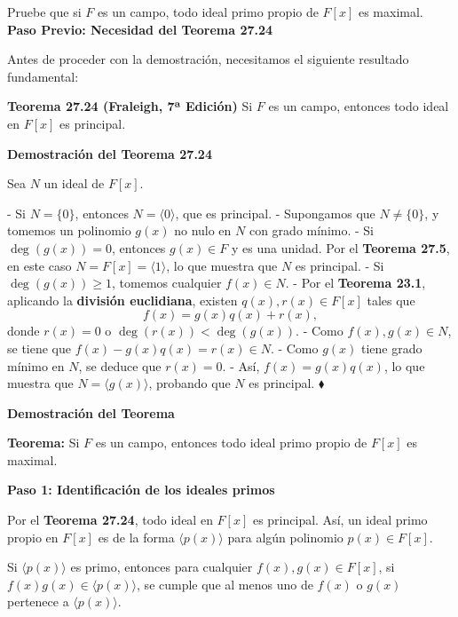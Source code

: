 Pruebe que si $F$ es un campo, todo ideal primo propio de $F[x]$ es maximal.
\\
\noindent
\textbf{Paso Previo: Necesidad del Teorema 27.24}

Antes de proceder con la demostración, necesitamos el siguiente resultado fundamental:

\smallskip

\textbf{Teorema 27.24 (Fraleigh, 7ª Edición)}  
Si \( F \) es un campo, entonces todo ideal en \( F[x] \) es principal.

\smallskip

\textbf{Demostración del Teorema 27.24}  

Sea \( N \) un ideal de \( F[x] \).  

- Si \( N = \{0\} \), entonces \( N = \langle 0 \rangle \), que es principal.  
- Supongamos que \( N \neq \{0\} \), y tomemos un polinomio \( g(x) \) no nulo en \( N \) con grado mínimo.  
  - Si \( \deg(g(x)) = 0 \), entonces \( g(x) \in F \) y es una unidad. Por el \textbf{Teorema 27.5}, en este caso \( N = F[x] = \langle 1 \rangle \), lo que muestra que \( N \) es principal.  
  - Si \( \deg(g(x)) \geq 1 \), tomemos cualquier \( f(x) \in N \).  
  - Por el \textbf{Teorema 23.1}, aplicando la \textbf{división euclidiana}, existen \( q(x), r(x) \in F[x] \) tales que  
    \[
    f(x) = g(x) q(x) + r(x),
    \]
    donde \( r(x) = 0 \) o \( \deg(r(x)) < \deg(g(x)) \).  
  - Como \( f(x), g(x) \in N \), se tiene que \( f(x) - g(x)q(x) = r(x) \in N \).  
  - Como \( g(x) \) tiene grado mínimo en \( N \), se deduce que \( r(x) = 0 \).  
  - Así, \( f(x) = g(x) q(x) \), lo que muestra que \( N = \langle g(x) \rangle \), probando que \( N \) es principal.  
\(\blacklozenge\)

\smallskip

\textbf{Demostración del Teorema}

\textbf{Teorema:}  
Si \( F \) es un campo, entonces todo ideal primo propio de \( F[x] \) es maximal.

\smallskip

\textbf{Paso 1: Identificación de los ideales primos}

Por el \textbf{Teorema 27.24}, todo ideal en \( F[x] \) es principal. Así, un ideal primo propio en \( F[x] \) es de la forma \( \langle p(x) \rangle \) para algún polinomio \( p(x) \in F[x] \).  

Si \( \langle p(x) \rangle \) es primo, entonces para cualquier \( f(x), g(x) \in F[x] \), si \( f(x) g(x) \in \langle p(x) \rangle \), se cumple que al menos uno de \( f(x) \) o \( g(x) \) pertenece a \( \langle p(x) \rangle \).  

